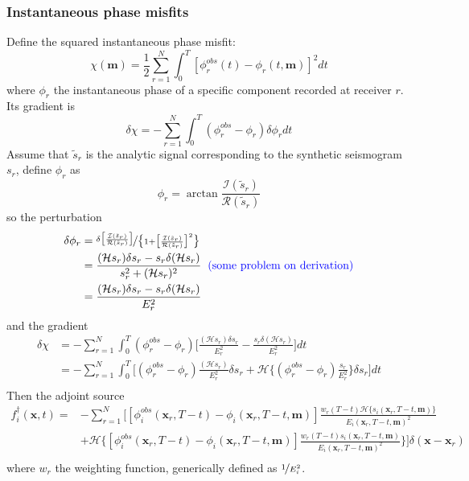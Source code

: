 \documentclass{article}
\newcommand{\mbf}[1]{\mathbf{#1}}
\newcommand{\myno}[1]{{\color{blue}#1}}
\newcommand{\mycR}{\mathcal{R}}
\newcommand{\mycI}{\mathcal{I}}
\newcommand{\mycH}{\mathcal{H}}
\begin{document}
\subsubsection{Instantaneous phase misfits}
Define the squared instantaneous phase misfit:
\[ \chi(\mbf m)=\frac{1}{2}\sum_{r=1}^N\int_0^T[\phi_r^{obs}(t)-\phi_r(t,\mbf m)]^2dt \]
where $\phi_r$ the instantaneous phase of a specific component recorded at receiver $r$. Its gradient is
\[ \delta\chi=-\sum_{r=1}^N\int_0^T(\phi_r^{obs}-\phi_r)\delta\phi_rdt \]
Assume that $\tilde s_r$ is the analytic signal corresponding to the synthetic seismogram $s_r$, define $\phi_r$ as
\[ \phi_r=\arctan\frac{\mycI(\tilde s_r)}{\mycR(\tilde s_r)} \]
so the perturbation
\begin{align*}
  \delta\phi_r & =\nicefrac{\delta\big[\frac{\mycI(\tilde s_r)}{\mycR(\tilde s_r)}\big]}{\big\{1+\big[\frac{\mycI(\tilde s_r)}{\mycR(\tilde s_r)}\big]^2\big\}} \\
    & =\frac{(\mycH s_r)\delta s_r-s_r\delta(\mycH s_r)}{s_r^2+(\mycH s_r)^2} \myno{\text{\hspace{2mm}(some problem on derivation)}} \\
    & =\frac{(\mycH s_r)\delta s_r-s_r\delta(\mycH s_r)}{E_r^2} \\
\end{align*}
and the gradient
\begin{align*}
  \delta\chi & =-\sum_{r=1}^N\int_0^T(\phi_r^{obs}-\phi_r)\Big[\frac{(\mycH s_r)\delta s_r}{E_r^2}-\frac{s_r\delta(\mycH s_r)}{E_r^2}\Big]dt \\
    & =-\sum_{r=1}^N\int_0^T\Big[(\phi_r^{obs}-\phi_r)\frac{(\mycH s_r)}{E_r^2}\delta s_r+\mycH\Big\{(\phi_r^{obs}-\phi_r)\frac{s_r}{E_r^2}\Big\}\delta s_r\Big]dt \\
\end{align*}
Then the adjoint source
\begin{align*}
  f_i^\dagger(\mbf x,t)= & -\sum_{r=1}^N\Big[[\phi_i^{obs}(\mbf x_r,T-t)-\phi_i(\mbf x_r,T-t,\mbf m)]\frac{w_r(T-t)\mycH\{s_i(\mbf x_r,T-t,\mbf m)\}}{E_i(\mbf x_r,T-t,\mbf m)^2} \\
    & +\mycH\Big\{[\phi_i^{obs}(\mbf x_r,T-t)-\phi_i(\mbf x_r,T-t,\mbf m)]\frac{w_r(T-t)s_i(\mbf x_r,T-t,\mbf m)}{E_i(\mbf x_r,T-t,\mbf m)^2}\Big\}\Big]\delta(\mbf x-\mbf x_r) \\
\end{align*}
where $w_r$ the weighting function, generically defined as $\nicefrac{1}{E_i^2}$.\par
\end{document}
